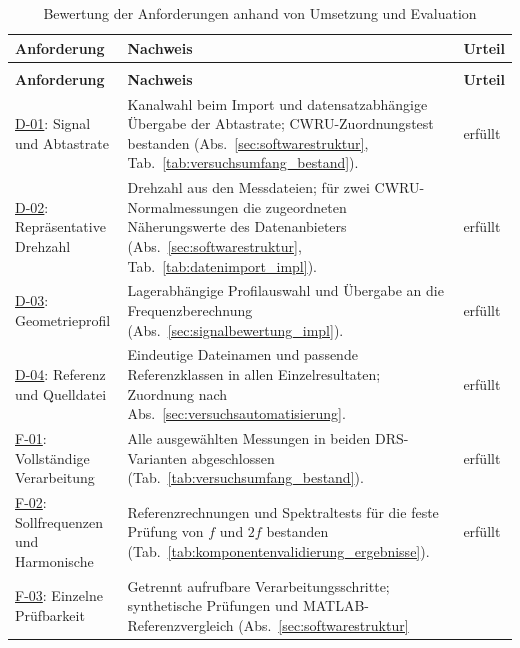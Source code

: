 \begingroup
\setlength{\tabcolsep}{3pt}
\renewcommand{\arraystretch}{1.12}
\small
\begin{longtable}{|
    >{\raggedright\arraybackslash}p{3.2cm}|
    >{\raggedright\arraybackslash}p{8.45cm}|
    >{\raggedright\arraybackslash}p{2.55cm}|}
  \caption{Bewertung der Anforderungen anhand von Umsetzung und Evaluation}
  \label{tab:anforderungserfuellung} \\
  \hline
  \textbf{Anforderung} & \textbf{Nachweis} & \textbf{Urteil} \\
  \hline
  \endfirsthead
  \multicolumn{3}{l}{\tablename~\thetable: Anforderungserfüllung (Fortsetzung)} \\
  \hline
  \textbf{Anforderung} & \textbf{Nachweis} & \textbf{Urteil} \\
  \hline
  \endhead
  \hline
  \endfoot
  \hyperlink{req:D-01}{D-01}: Signal und Abtastrate &
  Kanalwahl beim Import und datensatzabhängige Übergabe der Abtastrate;
  CWRU-Zuordnungstest bestanden
  (Abs.~\ref{sec:softwarestruktur}, Tab.~\ref{tab:versuchsumfang_bestand}). &
  erfüllt \\
  \hline
  \hyperlink{req:D-02}{D-02}: Repräsentative Drehzahl &
  Drehzahl aus den Messdateien; für zwei CWRU-Normalmessungen die
  zugeordneten Näherungswerte des Datenanbieters
  (Abs.~\ref{sec:softwarestruktur}, Tab.~\ref{tab:datenimport_impl}). &
  erfüllt \\
  \hline
  \hyperlink{req:D-03}{D-03}: Geometrieprofil &
  Lagerabhängige Profilauswahl und Übergabe an die Frequenzberechnung
  (Abs.~\ref{sec:signalbewertung_impl}). &
  erfüllt \\
  \hline
  \hyperlink{req:D-04}{D-04}: Referenz und Quelldatei &
  Eindeutige Dateinamen und passende Referenzklassen in allen Einzelresultaten;
  Zuordnung nach Abs.~\ref{sec:versuchsautomatisierung}. &
  erfüllt \\
  \hline
  \hyperlink{req:F-01}{F-01}: Vollständige Verarbeitung &
  Alle ausgewählten Messungen in beiden DRS-Varianten abgeschlossen
  (Tab.~\ref{tab:versuchsumfang_bestand}). &
  erfüllt \\
  \hline
  \hyperlink{req:F-02}{F-02}: Sollfrequenzen und Harmonische &
  Referenzrechnungen und Spektraltests für die feste Prüfung von $f$ und $2f$
  bestanden (Tab.~\ref{tab:komponentenvalidierung_ergebnisse}). &
  erfüllt \\
  \hline
  \hyperlink{req:F-03}{F-03}: Einzelne Prüfbarkeit &
  Getrennt aufrufbare Verarbeitungsschritte; synthetische Prüfungen und
  MATLAB-Referenzvergleich (Abs.~\ref{sec:softwarestruktur}

\end{longtable}
